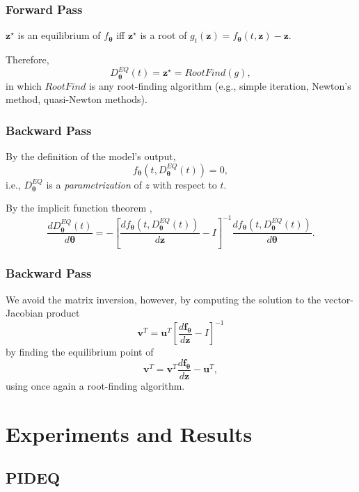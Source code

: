 \documentclass[t]{beamer}
\begin{document}
\begin{frame}
    \frametitle{Forward Pass}
    $\bm{z}^{\star}$ is an equilibrium of $f_{\bm{\theta}}$ iff $\bm{z}^{\star}$ is a root of $g_t(\bm{z}) = f_{\bm{\theta}}(t,\bm{z}) - \bm{z}$.
    \linebreak \pause

    Therefore, \[
    D^{EQ}_{\bm{\theta}}(t) = \bm{z}^{\star} = RootFind(g)
    ,\] in which $RootFind$ is any root-finding algorithm (e.g., simple iteration, Newton's method, quasi-Newton methods).
\end{frame}

\begin{frame}
    \frametitle{Backward Pass}
    By the definition of the model's output, \[
	f_{\bm{\theta}}(t,D^{EQ}_{\bm{\theta}}(t)) = 0
    ,\] i.e., $D^{EQ}_{\bm{\theta}}$ is a \emph{parametrization} of $z$ with respect to $t$.
    \linebreak \pause

    By the implicit function theorem \cite{Bai2019}, \[
	\frac{d D^{EQ}_{\bm{\theta}}(t)}{d \bm{\theta}} = - \left[ \frac{d f_{\bm{\theta}}(t,D^{EQ}_{\bm{\theta}}(t))}{d \bm{z}} - I \right]^{-1} \frac{d f_{\bm{\theta}}(t,D^{EQ}_{\bm{\theta}}(t))}{d \bm{\theta}}
    .\] 
\end{frame}

\begin{frame}
    \frametitle{Backward Pass}
    We avoid the matrix inversion, however, by computing the solution to the vector-Jacobian product \[
    \bm{v}^T = \bm{u}^T\left[ \frac{d \bm{f}_{\bm{\theta}}}{d \bm{z}} - I \right]^{-1}
    \] by finding the equilibrium point of \[
    \bm{v}^T = \bm{v}^T \frac{d \bm{f}_{\bm{\theta}}}{d \bm{z}} - \bm{u}^T
    ,\] using once again a root-finding algorithm.
    
\end{frame}

\section{Experiments and Results}

\subsection{PIDEQ}
\end{document}
